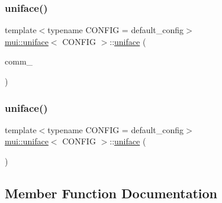 \mbox{\label{classmui_1_1uniface_a6a26805f1cdeec551194331dbf65c0ad}} 
\subsubsection{\texorpdfstring{uniface()}{uniface()}\hspace{0.1cm}{\footnotesize\ttfamily [3/4]}}
{\footnotesize\ttfamily template$<$typename C\+O\+N\+F\+IG  = default\+\_\+config$>$ \\
\hyperlink{classmui_1_1uniface}{mui\+::uniface}$<$ C\+O\+N\+F\+IG $>$\+::\hyperlink{classmui_1_1uniface}{uniface} (\begin{DoxyParamCaption}\item[{\hyperlink{classmui_1_1communicator}{communicator} $\ast$}]{comm\+\_\+ }\end{DoxyParamCaption})\hspace{0.3cm}{\ttfamily [inline]}}

\mbox{\label{classmui_1_1uniface_a83a87ba6918e8c36866057975ed7a097}} 
\subsubsection{\texorpdfstring{uniface()}{uniface()}\hspace{0.1cm}{\footnotesize\ttfamily [4/4]}}
{\footnotesize\ttfamily template$<$typename C\+O\+N\+F\+IG  = default\+\_\+config$>$ \\
\hyperlink{classmui_1_1uniface}{mui\+::uniface}$<$ C\+O\+N\+F\+IG $>$\+::\hyperlink{classmui_1_1uniface}{uniface} (\begin{DoxyParamCaption}\item[{const \hyperlink{classmui_1_1uniface}{uniface}$<$ C\+O\+N\+F\+IG $>$ \&}]{ }\end{DoxyParamCaption})\hspace{0.3cm}{\ttfamily [delete]}}



\subsection{Member Function Documentation}
\mbox{\label{classmui_1_1uniface_a5d1c452decc0aeab99aa071a82e81def}} 
